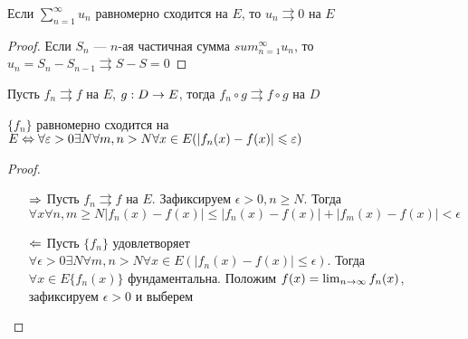 \begin{corollary}
  Если \(\sum_{n = 1}^\infty u_n\) равномерно сходится на \(E\), то \(u_n \rightrightarrows 0\) на \(E\)
\end{corollary}
\begin{proof}
  Если \(S_n\) --- \(n\)-ая частичная сумма \(sum_{n = 1}^\infty u_n\), то \(u_n = S_n - S_{n - 1} \rightrightarrows S - S = 0\)
\end{proof}

\begin{problem}
  Пусть \(f_n \rightrightarrows f\) на \(E\), \(g: D \rightarrow E\), тогда \(f_n \circ g \rightrightarrows f \circ g\) на \(D\)
\end{problem}

\begin{theorem}
  \(\{f_n\}\) равномерно сходится на \(E \Leftrightarrow \forall \varepsilon > 0 \exists N \forall m, n > N \forall x \in E (|f_n(x) - f(x)| \leqslant \varepsilon)\)
\end{theorem}
\begin{proof}
  \begin{enumerate}
    \item[\(\Rightarrow\)] Пусть \(f_n \rightrightarrows f\) на \(E\). Зафиксируем \(\epsilon > 0, n \ge N\). Тогда \(\forall x \forall n, m \ge N |f_n(x) -f(x)| \le |f_n(x) - f(x)| + |f_m(x) - f(x)| < \epsilon\)
    \item[\(\Leftarrow\)] Пусть \(\{f_n\}\) удовлетворяет \(\forall \epsilon > 0 \exists N \forall m, n > N \forall x \in E (|f_n(x) - f(x)| \le \epsilon)\). Тогда \(\forall x \in E \{f_n(x)\}\) фундаментальна. Положим \(f(x) = \lim_{n \rightarrow \infty}f_n(x)\), зафиксируем \(\epsilon > 0\) и выберем 
  \end{enumerate}
\end{proof}